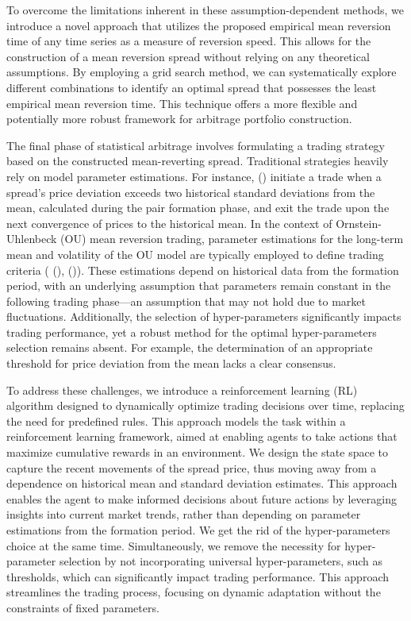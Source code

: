 \documentclass{article}
\begin{document}
To overcome the limitations inherent in these assumption-dependent methods, we introduce a novel approach that utilizes the proposed empirical mean reversion time of any time series as a measure of reversion speed. This allows for the construction of a mean reversion spread without relying on any theoretical assumptions. By employing a grid search method, we can systematically explore different combinations to identify an optimal spread that possesses the least empirical mean reversion time. This technique offers a more flexible and potentially more robust framework for arbitrage portfolio construction.

The final phase of statistical arbitrage involves formulating a trading strategy based on the constructed mean-reverting spread. Traditional strategies heavily rely on model parameter estimations. For instance, \citeauthor{gatev2006pairs}(\citeyear{gatev2006pairs}) initiate a trade when a spread's price deviation exceeds two historical standard deviations from the mean, calculated during the pair formation phase, and exit the trade upon the next convergence of prices to the historical mean. In the context of Ornstein-Uhlenbeck (OU) mean reversion trading, parameter estimations for the long-term mean and volatility of the OU model are typically employed to define trading criteria (\citeauthor{leung2015optimal} (\citeyear{leung2015optimal}), \citeauthor{meanReversionBook} (\citeyear{meanReversionBook})). These estimations depend on historical data from the formation period, with an underlying assumption that parameters remain constant in the following trading phase—an assumption that may not hold due to market fluctuations. Additionally, the selection of hyper-parameters significantly impacts trading performance, yet a robust method for the optimal hyper-parameters selection remains absent. For example, the determination of an appropriate threshold for price deviation from the mean lacks a clear consensus. 

To address these challenges, we introduce a reinforcement learning (RL) algorithm designed to dynamically optimize trading decisions over time, replacing the need for predefined rules. This approach models the task within a reinforcement learning framework, aimed at enabling agents to take actions that maximize cumulative rewards in an environment. We design the state space to capture the recent movements of the spread price, thus moving away from a dependence on historical mean and standard deviation estimates. This approach enables the agent to make informed decisions about future actions by leveraging insights into current market trends, rather than depending on parameter estimations from the formation period. We get the rid of the hyper-parameters choice at the same time.
Simultaneously, we remove the necessity for hyper-parameter selection by not incorporating universal hyper-parameters, such as thresholds, which can significantly impact trading performance. This approach streamlines the trading process, focusing on dynamic adaptation without the constraints of fixed parameters.
\end{document}
